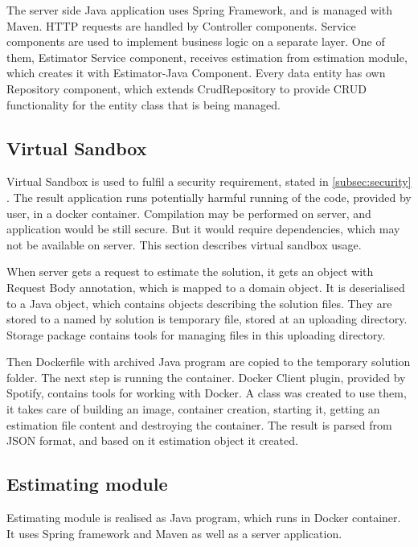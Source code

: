     The server side Java application uses Spring Framework, and is managed with Maven. HTTP requests are handled by Controller components. Service components are used to implement business logic on a separate layer. One of them, Estimator Service component, receives estimation from estimation module, which creates it with Estimator-Java Component. Every data entity has own Repository component, which extends CrudRepository to provide CRUD functionality for the entity class that is being managed.
    
        \subsection{Virtual Sandbox}
        Virtual Sandbox is used to fulfil a security requirement, stated in \ref{subsec:security} . The result application runs potentially harmful running of the code, provided by user, in a docker container. Compilation may be performed on server, and application would be still secure. But it would require dependencies, which may not be available on server. This section describes virtual sandbox usage.
        
        When server gets a request to estimate the solution, it gets an object with Request Body annotation, which is mapped to a domain object. It is deserialised to a Java object, which contains objects describing the solution files. They are stored to a named by solution is temporary file, stored at an uploading directory. Storage package contains tools for managing files in this uploading directory.
        
        Then Dockerfile with archived Java program are copied to the temporary solution folder. The next step is running the container. Docker Client plugin, provided by Spotify, contains tools for working with Docker. A class was created to use them, it takes care of building an image, container creation, starting it, getting an estimation file content and destroying the container. The result is parsed from JSON format, and based on it estimation object it created.
        
        
        \subsection{Estimating module}
        Estimating module is realised as Java program, which runs in Docker container. It uses Spring framework and Maven as well as a server application.
        
